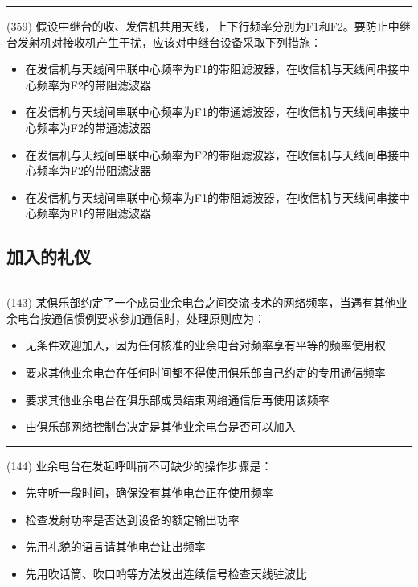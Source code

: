 \documentclass[twocolumn,hyperref,UTF8]{ctexart}  %
\begin{document}
\noindent\rule{0.5\textwidth}{1pt}
\heiti (359) 假设中继台的收、发信机共用天线，上下行频率分别为F1和F2。要防止中继台发射机对接收机产生干扰，应该对中继台设备采取下列措施： \songti {\color{gray} [LK0574] }
\begin{itemize}
	\item  在发信机与天线间串联中心频率为F1的带阻滤波器，在收信机与天线间串接中心频率为F2的带阻滤波器
	\item  在发信机与天线间串联中心频率为F1的带通滤波器，在收信机与天线间串接中心频率为F2的带通滤波器
	\item  在发信机与天线间串联中心频率为F2的带阻滤波器，在收信机与天线间串接中心频率为F2的带阻滤波器
	\item  在发信机与天线间串联中心频率为F1的带阻滤波器，在收信机与天线间串接中心频率为F1的带阻滤波器
\end{itemize}




\clearpage
\subsection{加入的礼仪}



\noindent\rule{0.5\textwidth}{1pt}
\heiti (143) 某俱乐部约定了一个成员业余电台之间交流技术的网络频率，当遇有其他业余电台按通信惯例要求参加通信时，处理原则应为： \songti {\color{gray} [LK0050] }
\begin{itemize}
	\item  无条件欢迎加入，因为任何核准的业余电台对频率享有平等的频率使用权
	\item  要求其他业余电台在任何时间都不得使用俱乐部自己约定的专用通信频率
	\item  要求其他业余电台在俱乐部成员结束网络通信后再使用该频率
	\item  由俱乐部网络控制台决定是其他业余电台是否可以加入
\end{itemize}


\noindent\rule{0.5\textwidth}{1pt}
\heiti (144) 业余电台在发起呼叫前不可缺少的操作步骤是： \songti {\color{gray} [LK0232] }
\begin{itemize}
	\item  先守听一段时间，确保没有其他电台正在使用频率
	\item  检查发射功率是否达到设备的额定输出功率
	\item  先用礼貌的语言请其他电台让出频率
	\item  先用吹话筒、吹口哨等方法发出连续信号检查天线驻波比
\end{itemize}
\end{document}
